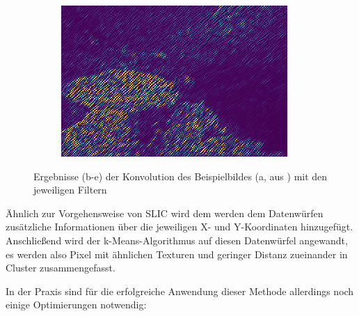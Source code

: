 \begin{figure}[h!]
\begin{subfigure}[t]{0.32\textwidth}
		\includegraphics[width=\textwidth,keepaspectratio]{images/gen/GEN_tsugf_filterbank_101027_4.png}
		\subcaption{}
	\end{subfigure}
	\hfill
	\begin{subfigure}[t]{0.32\textwidth}
		\hfill
	\end{subfigure}
	\caption{Ergebnisse (b-e) der Konvolution des Beispielbildes (a, aus \cite{bsd500}) mit den jeweiligen Filtern}
	\label{fig:tsugf_101027_raw}
\end{figure}

Ähnlich zur Vorgehensweise von SLIC wird dem werden dem Datenwürfen zusätzliche Informationen über die jeweiligen X- und Y-Koordinaten hinzugefügt. Anschließend wird der k-Means-Algorithmus auf diesen Datenwürfel angewandt, es werden also Pixel mit ähnlichen Texturen und geringer Distanz zueinander in Cluster zusammengefasst.

In der Praxis sind für die erfolgreiche Anwendung dieser Methode allerdings noch einige Optimierungen notwendig: \cite{mathworks_15}

